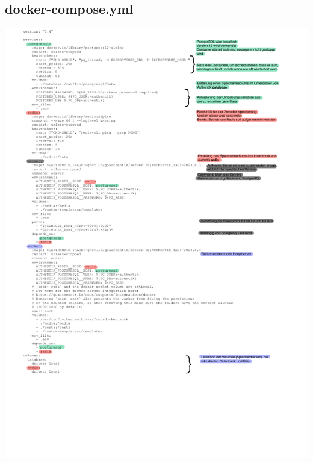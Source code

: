 \subsection{docker-compose.yml}
\label{app:docker-compose.yml}
\includegraphics{Anhang/docker-compose.pdf}

